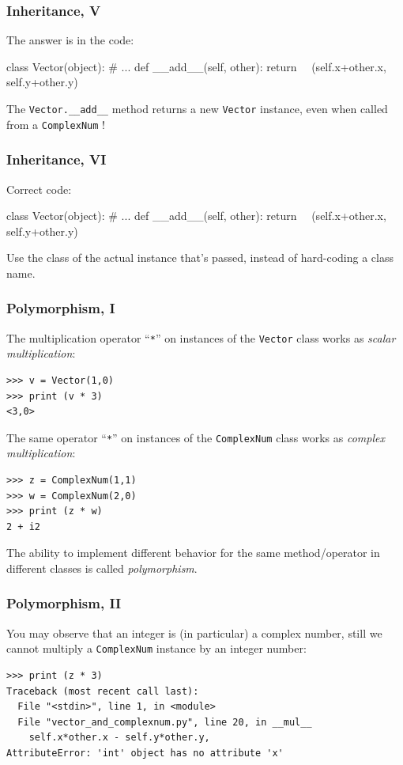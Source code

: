 \documentclass[english,serif,mathserif,xcolor=pdftex,dvipsnames,table]{beamer}
\begin{document}
\begin{frame}[fragile]
  \frametitle{Inheritance, V}
  The answer is in the code:
    \begin{python}
class Vector(object):
  # ...
  def __add__(self, other):
    return ~~(self.x+other.x, self.y+other.y)
    \end{python}
    \pause
    The \lstinline|Vector.__add__| method returns a new
    \lstinline|Vector| instance, even when called from a
    \lstinline|ComplexNum| !
\end{frame}


\begin{frame}[fragile]
  \frametitle{Inheritance, VI}
  Correct code:
    \begin{python}
class Vector(object):
  # ...
  def __add__(self, other):
    return ~~(self.x+other.x, self.y+other.y)
    \end{python}
    Use the class of the actual instance that's passed,
    instead of hard-coding a class name.
\end{frame}


\begin{frame}[fragile]
  \frametitle{Polymorphism, I}

  The multiplication operator ``\texttt{*}'' on instances of the
  \lstinline|Vector| class works as \emph{scalar multiplication}:
\begin{lstlisting}
>>> v = Vector(1,0)
>>> print (v * 3)
<3,0>
\end{lstlisting}

  \+
  The same operator ``\texttt{*}'' on instances of the
  \lstinline|ComplexNum| class works as \emph{complex multiplication}:
\begin{lstlisting}
>>> z = ComplexNum(1,1)
>>> w = ComplexNum(2,0)
>>> print (z * w)
2 + i2
\end{lstlisting}

  \+\small
  The ability to implement different behavior for the same
  method/operator in different classes is called \emph{polymorphism}.

\end{frame}

\begin{frame}[fragile]
  \frametitle{Polymorphism, II}

  You may observe that an integer is (in particular) a complex number,
  still we cannot multiply a \texttt{ComplexNum} instance by an
  integer number:
\begin{lstlisting}
>>> print (z * 3)
Traceback (most recent call last):
  File "<stdin>", line 1, in <module>
  File "vector_and_complexnum.py", line 20, in __mul__
    self.x*other.x - self.y*other.y,
AttributeError: 'int' object has no attribute 'x'
\end{lstlisting}

\end{frame}
\end{document}
